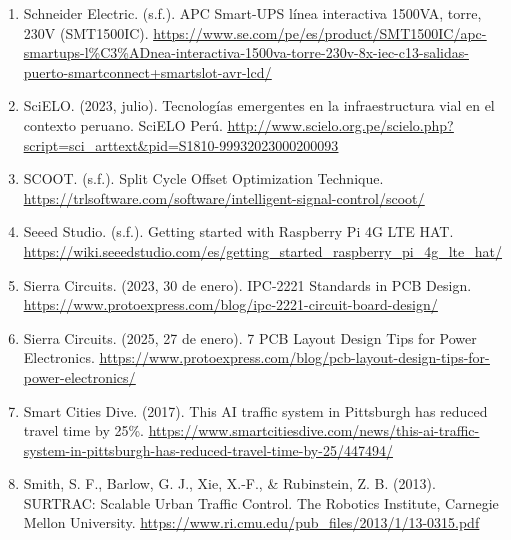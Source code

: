 \begin{enumerate}
\item
  Schneider Electric. (s.f.). APC Smart-UPS línea interactiva 1500VA, torre, 230V (SMT1500IC). \href{https://www.se.com/pe/es/product/SMT1500IC/apc-smartups-l\%C3\%ADnea-interactiva-1500va-torre-230v-8x-iec-c13-salidas-puerto-smartconnect+smartslot-avr-lcd/}{\ul{https://www.se.com/pe/es/product/SMT1500IC/apc-smartups-l\%C3\%ADnea-interactiva-1500va-torre-230v-8x-iec-c13-salidas-puerto-smartconnect+smartslot-avr-lcd/}}
\item
  SciELO. (2023, julio). Tecnologías emergentes en la infraestructura vial en el contexto peruano. SciELO Perú. \href{http://www.scielo.org.pe/scielo.php?script=sci_arttext&pid=S1810-99932023000200093}{\ul{http://www.scielo.org.pe/scielo.php?script=sci\_arttext\&pid=S1810-99932023000200093}}
\item
  SCOOT. (s.f.). Split Cycle Offset Optimization Technique. \href{https://trlsoftware.com/software/intelligent-signal-control/scoot/}{\ul{https://trlsoftware.com/software/intelligent-signal-control/scoot/}}
\item
  Seeed Studio. (s.f.). Getting started with Raspberry Pi 4G LTE HAT. \href{https://wiki.seeedstudio.com/es/getting_started_raspberry_pi_4g_lte_hat/}{\ul{https://wiki.seeedstudio.com/es/getting\_started\_raspberry\_pi\_4g\_lte\_hat/}}
\item
  Sierra Circuits. (2023, 30 de enero). IPC-2221 Standards in PCB Design. \href{https://www.protoexpress.com/blog/ipc-2221-circuit-board-design/}{\ul{https://www.protoexpress.com/blog/ipc-2221-circuit-board-design/}}
\item
  Sierra Circuits. (2025, 27 de enero). 7 PCB Layout Design Tips for Power Electronics. \href{https://www.protoexpress.com/blog/pcb-layout-design-tips-for-power-electronics/}{\ul{https://www.protoexpress.com/blog/pcb-layout-design-tips-for-power-electronics/}}
\item
  Smart Cities Dive. (2017). This AI traffic system in Pittsburgh has reduced travel time by 25\%. \href{https://www.smartcitiesdive.com/news/this-ai-traffic-system-in-pittsburgh-has-reduced-travel-time-by-25/447494/}{\ul{https://www.smartcitiesdive.com/news/this-ai-traffic-system-in-pittsburgh-has-reduced-travel-time-by-25/447494/}}
\item
  Smith, S. F., Barlow, G. J., Xie, X.-F., \& Rubinstein, Z. B. (2013). SURTRAC: Scalable Urban Traffic Control. The Robotics Institute, Carnegie Mellon University. \href{https://www.ri.cmu.edu/pub_files/2013/1/13-0315.pdf}{\ul{https://www.ri.cmu.edu/pub\_files/2013/1/13-0315.pdf}}

\end{enumerate}

